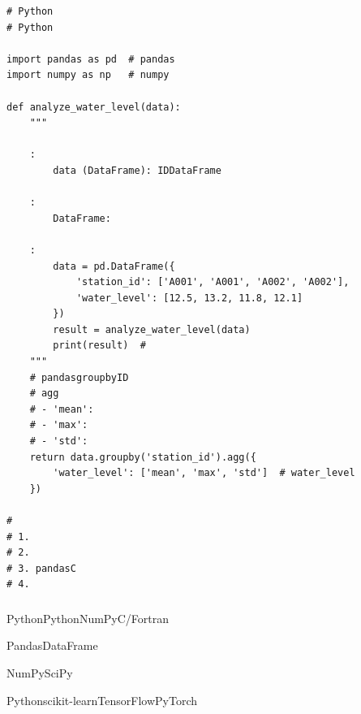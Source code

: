 \begin{lstlisting}[style=python]
# Python
# Python

import pandas as pd  # pandas
import numpy as np   # numpy

def analyze_water_level(data):
    """

    :
        data (DataFrame): IDDataFrame
        
    :
        DataFrame: 
        
    :
        data = pd.DataFrame({
            'station_id': ['A001', 'A001', 'A002', 'A002'],
            'water_level': [12.5, 13.2, 11.8, 12.1]
        })
        result = analyze_water_level(data)
        print(result)  # 
    """
    # pandasgroupbyID
    # agg
    # - 'mean': 
    # - 'max':   
    # - 'std': 
    return data.groupby('station_id').agg({
        'water_level': ['mean', 'max', 'std']  # water_level
    })
    
# 
# 1. 
# 2. 
# 3. pandasC
# 4. 
\end{lstlisting}

\hypertarget{section-82}{%
\subsubsection{}\label{section-82}}

PythonPythonNumPyC/Fortran

PandasDataFrame

NumPySciPy

\important{}Pythonscikit-learnTensorFlowPyTorch

